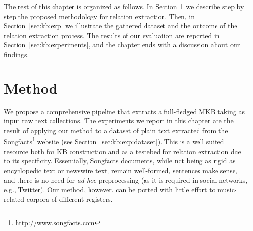 

The rest of this chapter is organized as follows. In Section~\ref{sec:kb:method} we describe step by step the proposed methodology for relation extraction. Then, in Section~\ref{sec:kb:exp} we illustrate the gathered dataset and the outcome of the relation extraction process. The results of our evaluation are reported in Section~\ref{sec:kb:experiments}, and the chapter ends with a discussion about our findings.

\section{Method}
\label{sec:kb:method}

We propose a comprehensive pipeline that extracts a full-fledged MKB taking as input raw text collections. The experiments we report in this chapter are the result of applying our method to a dataset of plain text extracted from the Songfacts\footnote{\url{http://www.songfacts.com}} website (see Section~\ref{sec:kb:exp:dataset}). This is a well suited resource both for KB construction and as a testebed for relation extraction due to its specificity. Essentially, Songfacts documents, while not being as rigid as encyclopedic text or newswire text, remain well-formed, sentences make sense, and there is no need for \textit{ad-hoc} preprocessing (as it is required in social networks, e.g., Twitter). Our method, however, can be ported with little effort to music-related corpora of different registers.

